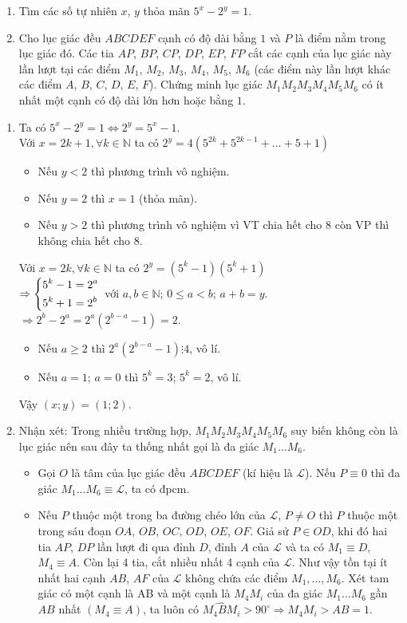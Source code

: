 \begin{ex}%
\hfill
	\begin{enumerate}
		\item Tìm các số tự nhiên $x$, $y$ thỏa mãn $5^x-2^y=1$.
		\item Cho lục giác đều $ABCDEF$ cạnh có độ dài bằng $1$ và $P$ là điểm nằm trong lục giác đó. Các tia $AP$, $BP$, $CP$, $DP$, $EP$, $FP$ cắt các cạnh của lục giác này lần lượt tại các điểm $M_1$, $M_2$, $M_3$, $M_4$, $M_5$, $M_6$ (các điểm này lần lượt khác các điểm $A$, $B$, $C$, $D$, $E$, $F$). Chứng minh lục giác $M_1M_2M_3M_4M_5M_6$ có ít nhất một cạnh có độ dài lớn hơn hoặc bằng $1$.
	\end{enumerate}
\loigiai
    {\begin{enumerate}
   	\item Ta có $5^x-2^y=1\Leftrightarrow2^y=5^x-1$.\\
   	Với $x=2k+1,\forall k\in\mathbb{N}$ ta có
   	$2^y=4(5^{2k}+5^{2k-1}+\ldots+5+1)$
   	\begin{itemize}
   		\item Nếu $y<2$ thì phương trình vô nghiệm.
   		\item Nếu $y=2$ thì $x=1$ (thỏa mãn).
   		\item Nếu $y>2$ thì phương trình vô nghiệm vì VT chia hết cho $8$ còn VP thì không chia hết cho $8$.
   	\end{itemize}
   	Với $x=2k,\forall k\in \mathbb{N}$ ta có $2^y=(5^k-1)(5^k+1)$\\
   	$\Rightarrow \left\{\begin{aligned}&5^k-1=2^a\\&5^k+1=2^b\end{aligned}\right.$ với $a,b\in\mathbb{N}$; $0\le a<b$; $a+b=y$.
   	$\Rightarrow2^b-2^a=2^a(2^{b-a}-1)=2$.
   	\begin{itemize}
   		\item Nếu $a\ge2$ thì $2^a(2^{b-a}-1)\vdots4$, vô lí.
   		\item Nếu $a=1$; $a=0$ thì $5^k=3$; $5^k=2$, vô lí.
   	\end{itemize} 
   	Vậy $(x;y)=(1;2)$.
   	\item Nhận xét: Trong nhiều trường hợp, $M_1M_2M_3M_4M_5M_6$ suy biến không còn là lục giác nên sau đây ta thống nhất gọi là đa giác $M_1\ldots M_6$.
   	\begin{itemize}
   		\item Gọi $O$ là tâm của lục giác đều $ABCDEF$ (kí hiệu là $\mathscr{L}$). Nếu $P\equiv 0$ thì đa giác $M_1...M_6\equiv \mathscr{L}$, ta có đpcm.
   		\item Nếu $P$ thuộc một trong ba đường chéo lớn của $\mathscr{L}$, $P\ne O$ thì $P$ thuộc một trong sáu đoạn $OA$, $OB$, $OC$, $OD$, $OE$, $OF$. Giả sử $P\in OD$, khi đó hai tia $AP$, $DP$ lần lượt đi qua đỉnh $D$, đỉnh $A$ của $\mathscr{L}$ và ta có $M_1\equiv D$, $M_4\equiv A$. Còn lại 4 tia, cắt nhiều nhất 4 cạnh của $\mathscr{L}$. Như vậy tồn tại ít nhất hai cạnh $AB$, $AF$ của $\mathscr{L}$ không chứa các điểm $M_1,...,M_6$. Xét tam giác có một cạnh là AB và một cạnh là $M_4M_i$ của đa giác $M_1\ldots M_6$ gần $AB$ nhất $\left(M_4\equiv A\right)$, ta luôn có $\widehat{M_4BM_i}>90^\circ\Rightarrow M_4M_i>AB=1$.

\end{itemize}
\end{enumerate}}
\end{ex}
